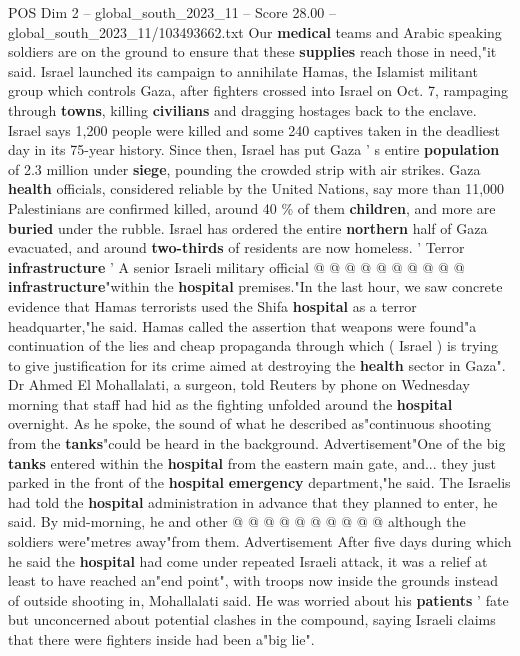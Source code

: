 \begin{textsample}{POS Dim 2 – global\_south\_2023\_11 – Score 28.00 – global\_south\_2023\_11/103493662.txt}
Our \textbf{medical} teams and Arabic speaking soldiers are on the ground to ensure that these \textbf{supplies} reach those in need,"it said.
Israel launched its campaign to annihilate Hamas, the Islamist militant group which controls Gaza, after fighters crossed into Israel on Oct. 7, rampaging through \textbf{towns}, killing \textbf{civilians} and dragging hostages back to the enclave.
Israel says 1,200 people were killed and some 240 captives taken in the deadliest day in its 75-year history.
Since then, Israel has put Gaza ' s entire \textbf{population} of 2.3 million under \textbf{siege}, pounding the crowded strip with air strikes.
Gaza \textbf{health} officials, considered reliable by the United Nations, say more than 11,000 Palestinians are confirmed killed, around 40 \% of them \textbf{children}, and more are \textbf{buried} under the rubble.
Israel has ordered the entire \textbf{northern} half of Gaza evacuated, and around \textbf{two-thirds} of residents are now homeless. ' Terror \textbf{infrastructure} ' A senior Israeli military official @ @ @ @ @ @ @ @ @ @ \textbf{infrastructure}"within the \textbf{hospital} premises."In the last hour, we saw concrete evidence that Hamas terrorists used the Shifa \textbf{hospital} as a terror headquarter,"he said.
Hamas called the assertion that weapons were found"a continuation of the lies and cheap propaganda through which ( Israel ) is trying to give justification for its crime aimed at destroying the \textbf{health} sector in Gaza".
Dr Ahmed El Mohallalati, a surgeon, told Reuters by phone on Wednesday morning that staff had hid as the fighting unfolded around the \textbf{hospital} overnight.
As he spoke, the sound of what he described as"continuous shooting from the \textbf{tanks}"could be heard in the background.
Advertisement"One of the big \textbf{tanks} entered within the \textbf{hospital} from the eastern main gate, and... they just parked in the front of the \textbf{hospital} \textbf{emergency} department,"he said.
The Israelis had told the \textbf{hospital} administration in advance that they planned to enter, he said.
By mid-morning, he and other @ @ @ @ @ @ @ @ @ @ although the soldiers were"metres away"from them.
Advertisement After five days during which he said the \textbf{hospital} had come under repeated Israeli attack, it was a relief at least to have reached an"end point", with troops now inside the grounds instead of outside shooting in, Mohallalati said.
He was worried about his \textbf{patients} ' fate but unconcerned about potential clashes in the compound, saying Israeli claims that there were fighters inside had been a"big lie".

\end{textsample}
